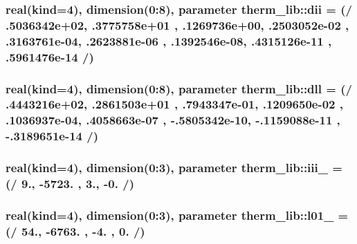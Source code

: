 \subsubsection[{dii}]{\setlength{\rightskip}{0pt plus 5cm}real(kind=4), dimension(0\+:8), parameter therm\+\_\+lib\+::dii = (/ .\+5036342e+02, .\+3775758e+01 , .\+1269736e+00, .\+2503052e-\/02 , .\+3163761e-\/04, .\+2623881e-\/06 , .\+1392546e-\/08, .\+4315126e-\/11 , .\+5961476e-\/14 /)}\label{namespacetherm__lib_ac6f7b02070a3ef627b731ecd1b7afb1a}
\hypertarget{namespacetherm__lib_acfbfc8c511318be0ac3c435bec00f876}{}
\subsubsection[{dll}]{\setlength{\rightskip}{0pt plus 5cm}real(kind=4), dimension(0\+:8), parameter therm\+\_\+lib\+::dll = (/ .\+4443216e+02, .\+2861503e+01 , .\+7943347e-\/01, .\+1209650e-\/02 , .\+1036937e-\/04, .\+4058663e-\/07 , -\/.\+5805342e-\/10, -\/.\+1159088e-\/11 , -\/.\+3189651e-\/14 /)}\label{namespacetherm__lib_acfbfc8c511318be0ac3c435bec00f876}
\hypertarget{namespacetherm__lib_af62776bc58906738f54b9b6be6b672d6}{}
\subsubsection[{iii\+\_\+7}]{\setlength{\rightskip}{0pt plus 5cm}real(kind=4), dimension(0\+:3), parameter therm\+\_\+lib\+::iii\+\_ = (/ 9., -\/5723. , 3., -\/0. /)}\label{namespacetherm__lib_af62776bc58906738f54b9b6be6b672d6}
\hypertarget{namespacetherm__lib_a32ef1fd4d35773be9ba1f5a7dbc13b6e}{}
\subsubsection[{l01\+\_\+10}]{\setlength{\rightskip}{0pt plus 5cm}real(kind=4), dimension(0\+:3), parameter therm\+\_\+lib\+::l01\+\_ = (/ 54., -\/6763. , -\/4. , 0. /)}\label{namespacetherm__lib_a32ef1fd4d35773be9ba1f5a7dbc13b6e}
\hypertarget{namespacetherm__lib_adaf6c70605ef5072ebc0a71bb1189d99}{}
